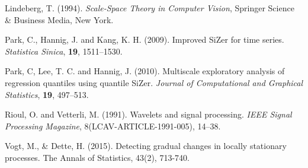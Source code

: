 \documentclass[12pt]{article}
\begin{document}
\begin{description}
\item Lindeberg, T. (1994). {\it Scale-Space Theory in Computer Vision}, Springer Science \& Business Media, New York.


\item Park, C., Hannig, J. and Kang, K. H. (2009). Improved SiZer for time series. {\it Statistica Sinica}, {\bf 19}, 1511--1530. 

\item Park, C, Lee, T. C. and Hannig, J. (2010). Multiscale exploratory analysis of regression quantiles using quantile SiZer.
{\it Journal of Computational and Graphical Statistics}, {\bf 19}, 497--513.

\item Rioul, O. and Vetterli, M. (1991). Wavelets and signal processing. {\it IEEE Signal Processing Magazine},  8(LCAV-ARTICLE-1991-005), 14--38.

\item Vogt, M., \& Dette, H. (2015). Detecting gradual changes in locally stationary processes. The Annals of Statistics, 43(2), 713-740.

\end{description}
\end{document}
